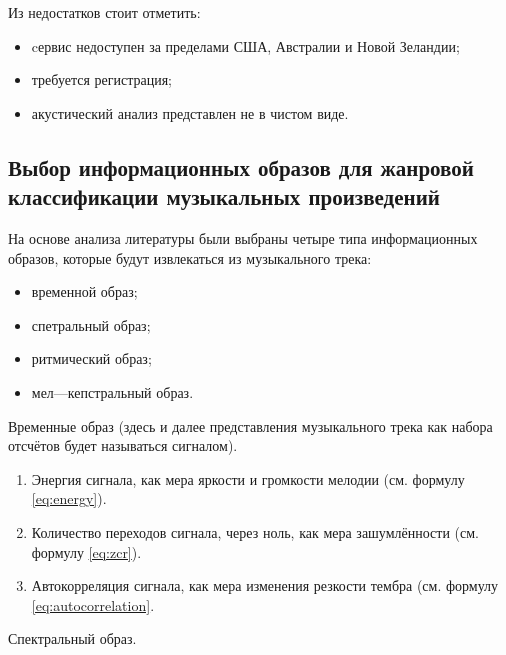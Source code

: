 Из недостатков стоит отметить:
\begin{itemize}
\item cервис недоступен за пределами США, Австралии и Новой Зеландии;
\item требуется регистрация;
\item акустический анализ представлен не в чистом виде.
\end{itemize}



\subsection{Выбор информационных образов для жанровой классификации музыкальных произведений}
\label{sub:domain:feature_selection}
На основе анализа литературы были выбраны четыре типа информационных образов, которые будут извлекаться из музыкального трека:
\begin{itemize}
\item временной образ;
\item спетральный образ;
\item ритмический образ;
\item мел—кепстральный образ.
\end{itemize}

Временные образ (здесь и далее представления музыкального трека как набора отсчётов будет называться сигналом).

\begin{enumerate}[label=\arabic*.]
\item Энергия сигнала, как мера яркости и громкости мелодии (см. формулу \ref{eq:energy}).
\item Количество переходов сигнала, через ноль, как мера зашумлённости (см. формулу \ref{eq:zcr}).
\item Автокорреляция сигнала, как мера изменения резкости тембра (см. формулу \ref{eq:autocorrelation}.
\end{enumerate}

Спектральный образ.

